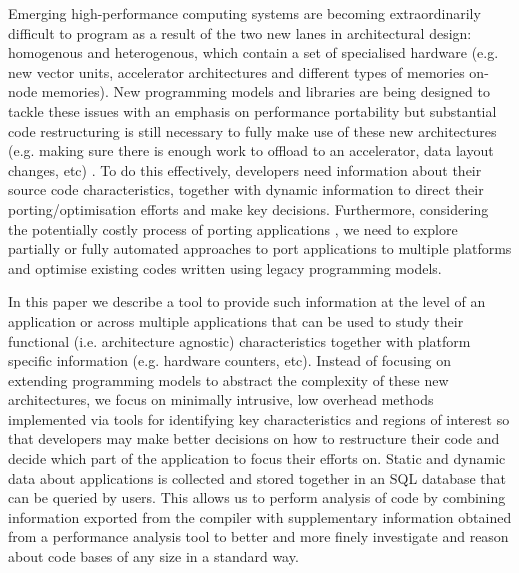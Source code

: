 Emerging high-performance computing systems are becoming extraordinarily difficult to program as a result of the  
two new lanes in architectural design: homogenous and heterogenous, which contain a set of specialised 
hardware (e.g. new vector units,  accelerator architectures and different types of memories on-node memories). 
New programming models and libraries are being designed to tackle these issues with an emphasis on performance portability but substantial code restructuring is still 
necessary to fully make use of these new architectures (e.g. making sure there is enough work to offload to an accelerator, data layout changes, etc) \cite{anantharaj2013}\cite{titan}.
To do this effectively, developers need information about their source code characteristics, together with 
dynamic information to direct their porting/optimisation efforts and make key decisions.
Furthermore, considering the potentially costly process of porting applications \cite{larrea2016early}, we need to 
explore partially or fully automated approaches to port applications to multiple platforms and optimise existing 
codes written using legacy programming models.

In this paper we describe a tool to provide such information at the level of an 
application or across multiple applications that can be used to study their functional (i.e. architecture agnostic) characteristics together with platform specific information (e.g. hardware counters, etc).
Instead of focusing on extending programming models to abstract the complexity of these new architectures, we 
focus on minimally intrusive, low overhead methods implemented via tools for identifying key characteristics and 
regions of interest so that developers may make better decisions on how to restructure their code and
decide which part of the application to focus their efforts on.
Static and dynamic data about applications is collected and stored together in an \acs{SQL} database that can be 
queried by users.
This allows us to perform analysis of code by combining information exported from the compiler with 
supplementary information obtained from a performance analysis tool to better and more finely investigate and 
reason about code bases of any size in a standard way.

